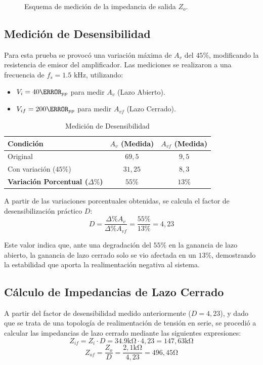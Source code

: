 \begin{figure}[!ht]
    \centering
    
    \caption{Esquema de medición de la impedancia de salida $Z_o$.}
    \label{fig:medicion_zo}
\end{figure}

\subsection{Medición de Desensibilidad}
Para esta prueba se provocó una variación máxima de $A_v$ del $45 \percent$, modificando la resistencia de emisor del 
amplificador. Las mediciones se realizaron a una frecuencia de $f_s = 1.5 \text{ kHz}$, utilizando:
\begin{itemize}
    \item $V_i = 40 \mV_{pp}$ para medir $A_v$ (Lazo Abierto).
    \item $V_{if} = 200 \mV_{pp}$ para medir $A_{vf}$ (Lazo Cerrado).
\end{itemize}

\begin{table}[!ht]
    \centering
    \begin{tabular}{|l|c|c|}
        \hline
        \textbf{Condición} & \textbf{$A_v$ (Medida)} & \textbf{$A_{vf}$ (Medida)} \\ \hline
        Original & $69,5$ & $9,5$ \\ \hline
        Con variación ($45\%$) & $31,25$ & $8,3$ \\ \hline
        \textbf{Variación Porcentual ($\Delta \percent$)} & $55\%$ & $13\%$ \\ \hline
    \end{tabular}
    \caption{Medición de Desensibilidad}
    \label{tab:desensibilidad}
\end{table}

A partir de las variaciones porcentuales obtenidas, se calcula el factor de desensibilización práctico $D$:
\begin{equation}
    D = \frac{\Delta \% A_v}{\Delta \% A_{vf}} = \frac{55\%}{13\%} = 4,23
\end{equation}

Este valor indica que, ante una degradación del $55\%$ en la ganancia de lazo abierto, la ganancia de lazo cerrado solo se vio afectada en un $13\%$, demostrando la estabilidad que aporta la realimentación negativa al sistema.

\subsection{Cálculo de Impedancias de Lazo Cerrado}
A partir del factor de desensibilidad medido anteriormente ($D = 4,23$), y dado que se trata de una topología de realimentación de tensión en serie, se procedió a calcular las impedancias de lazo cerrado mediante las siguientes expresiones:
\begin{equation}
    Z_{if} = Z_i \cdot D = 34.9 \si{\kilo\ohm} \cdot 4,23 = 147,63 \si{\kilo\ohm}
\end{equation}
\begin{equation}
    Z_{of} = \frac{Z_o}{D} = \frac{2,1 \si{\kilo\ohm}}{4,23} = 496,45 \si{\ohm}
\end{equation}

